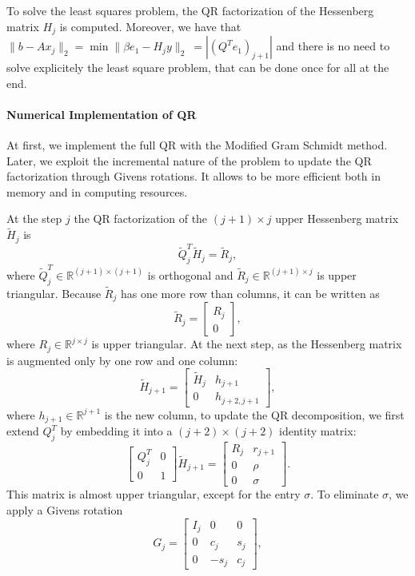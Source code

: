 \documentclass[hidelinks]{article}
\begin{document}
\noindent To solve the least squares problem, the QR factorization of the Hessenberg matrix $H_j$ is computed. Moreover, we have that $ \| b - Ax_j \|_2 = \min \| \beta e_1 - H_j y \|_2 \ = |(Q^Te_1)_{j+1}|$ and there is no need to solve explicitely the least square problem, that can be done once for all at the end.

\paragraph{Numerical Implementation of QR}
At first, we implement the full QR with the Modified Gram Schmidt method. Later, we exploit the incremental nature of the problem to update the QR factorization through Givens rotations. It allows to be more efficient both in memory and in computing resources.

\noindent At the step $j$ the QR factorization of the \((j+1) \times j\) upper Hessenberg matrix \( \widetilde{H}_j \) is
\[
\widetilde{Q}^T_j \widetilde{H}_j = \widetilde{R}_j,
\]
where \( \widetilde{Q}^T_j \in \mathbb{R}^{(j+1) \times (j+1)} \) is orthogonal and \( \widetilde{R}_j \in \mathbb{R}^{(j+1) \times j} \) is upper triangular. Because \( \widetilde{R}_j \) has one more row than columns, it can be written as
\[
\widetilde{R}_j = 
\begin{bmatrix}
R_j \\
0
\end{bmatrix},
\]
where \( R_j \in \mathbb{R}^{j \times j} \) is upper triangular.
At the next step, as the Hessenberg matrix is augmented only by one row and one column:
\[
\widetilde{H}_{j+1} = 
\begin{bmatrix}
\widetilde{H}_j & h_{j+1} \\
0 & h_{j+2,j+1}
\end{bmatrix},
\]
where \( h_{j+1} \in \mathbb{R}^{j+1} \) is the new column, to update the QR decomposition, we first extend \( Q^T_j \) by embedding it into a \((j+2) \times (j+2)\) identity matrix:
\[
\begin{bmatrix}
Q^T_j & 0 \\
0 & 1
\end{bmatrix} \widetilde{H}_{j+1} =
\begin{bmatrix}
R_j & r_{j+1} \\
0 & \rho \\
0 & \sigma
\end{bmatrix}.
\]
This matrix is almost upper triangular, except for the entry \( \sigma \). To eliminate \( \sigma \), we apply a Givens rotation
\[
G_j = 
\begin{bmatrix}
I_j & 0 & 0 \\
0 & c_j & s_j \\
0 & -s_j & c_j
\end{bmatrix},
\]
\end{document}
